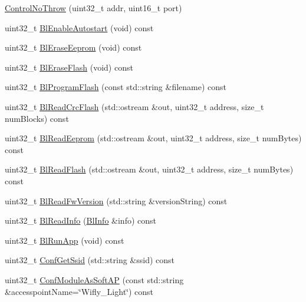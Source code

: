 \begin{DoxyCompactItemize}
\item 
\hyperlink{class_wy_light_1_1_control_no_throw_a904cf007af9dad72fc9f561e5bf3fcbf}{Control\-No\-Throw} (uint32\-\_\-t addr, uint16\-\_\-t port)
\item 
uint32\-\_\-t \hyperlink{class_wy_light_1_1_control_no_throw_a4a84bbb426ef1b98f1f4f01e4c3c69c5}{Bl\-Enable\-Autostart} (void) const 
\item 
uint32\-\_\-t \hyperlink{class_wy_light_1_1_control_no_throw_a5fba41a8dff954ad4e2a69507ffb063d}{Bl\-Erase\-Eeprom} (void) const 
\item 
uint32\-\_\-t \hyperlink{class_wy_light_1_1_control_no_throw_aff9296834b2cdce95fc151f06042babf}{Bl\-Erase\-Flash} (void) const 
\item 
uint32\-\_\-t \hyperlink{class_wy_light_1_1_control_no_throw_a8005c5dd9fff473bb43c59c956c4a772}{Bl\-Program\-Flash} (const std\-::string \&filename) const 
\item 
uint32\-\_\-t \hyperlink{class_wy_light_1_1_control_no_throw_a7544aca0b4ca8bbadfea5bb1be728cb2}{Bl\-Read\-Crc\-Flash} (std\-::ostream \&out, uint32\-\_\-t address, size\-\_\-t num\-Blocks) const 
\item 
uint32\-\_\-t \hyperlink{class_wy_light_1_1_control_no_throw_a49dee62bcd9806fe3f521793312ba30a}{Bl\-Read\-Eeprom} (std\-::ostream \&out, uint32\-\_\-t address, size\-\_\-t num\-Bytes) const 
\item 
uint32\-\_\-t \hyperlink{class_wy_light_1_1_control_no_throw_a20162c1a357bd55488552eca0d5872ca}{Bl\-Read\-Flash} (std\-::ostream \&out, uint32\-\_\-t address, size\-\_\-t num\-Bytes) const 
\item 
uint32\-\_\-t \hyperlink{class_wy_light_1_1_control_no_throw_a79cd174ece3a779b605a8e3c3e9f2f82}{Bl\-Read\-Fw\-Version} (std\-::string \&version\-String) const 
\item 
uint32\-\_\-t \hyperlink{class_wy_light_1_1_control_no_throw_acf73db9a4da4dfc1330e14cbf47864e3}{Bl\-Read\-Info} (\hyperlink{struct_wy_light_1_1_bl_info}{Bl\-Info} \&info) const 
\item 
uint32\-\_\-t \hyperlink{class_wy_light_1_1_control_no_throw_ab5d301c3983548d341890ea4291c9854}{Bl\-Run\-App} (void) const 
\item 
uint32\-\_\-t \hyperlink{class_wy_light_1_1_control_no_throw_af3e8e289fa6eb33dce5c7e262be3eecb}{Conf\-Get\-Ssid} (std\-::string \&ssid) const 
\item 
uint32\-\_\-t \hyperlink{class_wy_light_1_1_control_no_throw_a91e2d2a39eb4ab9f4780025be68cfe90}{Conf\-Module\-As\-Soft\-A\-P} (const std\-::string \&accesspoint\-Name=\char`\"{}Wifly\-\_\-\-Light\char`\"{}) const 

\end{DoxyCompactItemize}
